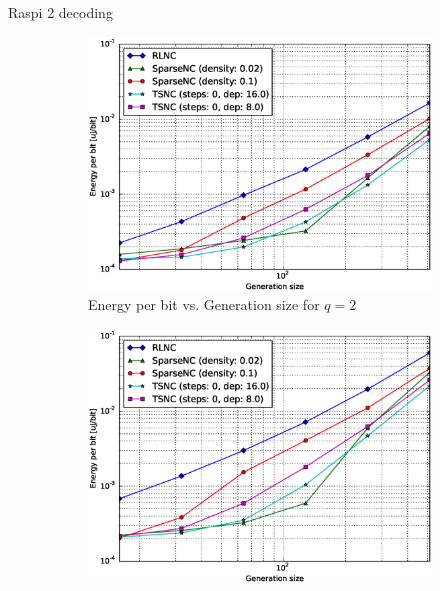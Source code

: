 Raspi 2 decoding

\begin{figure}
    \centering
    \begin{subfigure}[b]{0.475\textwidth}
        \centering
        \includegraphics[width=1.1\textwidth]{images/23_07_2015/energy_per_bit_vs_generation_size_Rasp_v2_Binary_decoder_1600.eps}
        \caption[]%
        {{\small Energy per bit vs. Generation size for $q = 2$}}    
        \label{fig:dec_ene_rasp2_gen_gf2}
    \end{subfigure}
    \hfill
    \begin{subfigure}[b]{0.475\textwidth}  
        \centering 
        \includegraphics[width=1.1\textwidth]{images/23_07_2015/energy_per_bit_vs_generation_size_Rasp_v2_Binary8_decoder_1600.eps}

\end{subfigure}
\end{figure}
